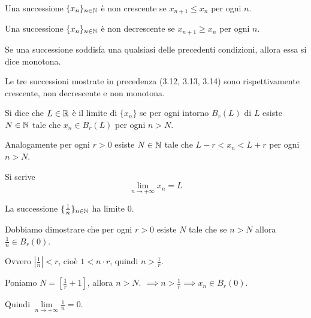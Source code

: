 \begin{definition}
Una successione $\{x_n\}_{n \in \mathbb N}$ è non crescente se $x_{n+1} \le x_n$ per ogni $n$.
\end{definition}

\begin{definition}
Una successione $\{x_n\}_{n \in \mathbb N}$ è non decrescente se $x_{n+1} \ge x_n$ per ogni $n$.
\end{definition}

Se una successione soddisfa una qualsiasi delle precedenti condizioni, allora essa si dice monotona.

\begin{example}
Le tre successioni mostrate in precedenza (3.12, 3.13, 3.14) sono rispettivamente crescente, non decrescente e non monotona.
\end{example}

\begin{definition}
Si dice che $L \in \mathbb R$ è il limite di $\{ x_n \}$ se per ogni intorno $B_r(L)$ di $L$ esiste $N \in \mathbb N$ tale che $x_n \in B_r(L)$ per ogni $n > N$.

Analogamente per ogni $r > 0$ esiste $N \in \mathbb N$ tale che $L-r < x_n < L+r$ per ogni $n > N$.

Si scrive
\begin{equation*}
\lim_{n \to +\infty}{x_n} = L
\end{equation*}
\end{definition}

\begin{example}
La successione $\{\frac{1}{n}\}_{n \in \mathbb N}$ ha limite 0.

Dobbiamo dimostrare che per ogni $r > 0$ esiste $N$ tale che se $n > N$ allora $\frac{1}{n} \in B_r(0)$.

Ovvero $|\frac{1}{n}| < r$, cioè $1 < n \cdot r$, quindi $n > \frac{1}{r}$.

Poniamo $N = [\frac{1}{r} + 1]$, allora $n > N$. $\implies n > \frac{1}{r} \implies x_n \in B_r(0)$. 

Quindi $\lim\limits_{n \to +\infty} \frac{1}{n} = 0$.
\end{example}